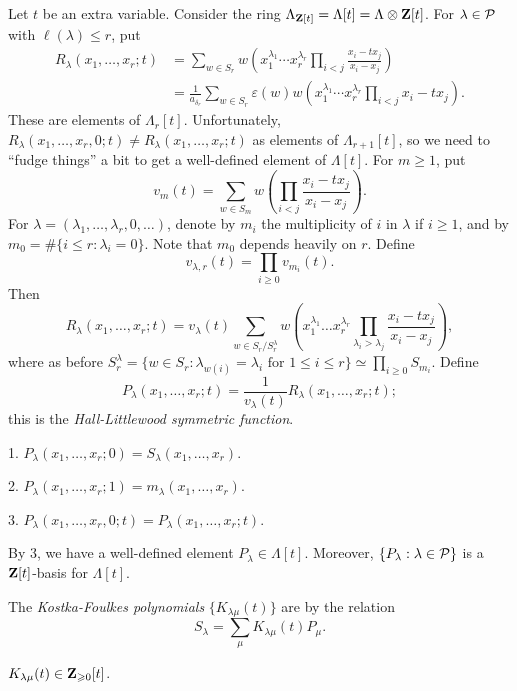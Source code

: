 Let $t$ be an extra variable. Consider the ring 
$\Lambda_{\mathbf{Z}[t]} = \Lambda[t] = \Lambda\otimes \mathbf{Z}[t]$. For $\lambda\in \mathcal{P}$ 
with $\ell(\lambda)\leqslant r$, put 
\begin{align*}
  R_\lambda(x_1,\dots,x_r;t) 
    &= \sum_{w\in S_r} w\left(x_1^{\lambda_1} \dotsm x_r^{\lambda_r} \prod_{i<j} \frac{x_i - t x_j}{x_i - x_j}\right) \\
    &= \frac{1}{a_{\delta_r}} \sum_{w\in S_r} \varepsilon(w) w\left(x_1^{\lambda_1} \dotsm x_r^{\lambda_r} \prod_{i<j} x_i - t x_j\right) .
\end{align*}
These are elements of $\Lambda_r[t]$. Unfortunately, 
$R_\lambda(x_1,\dots,x_r,0;t)\ne R_\lambda(x_1,\dots,x_r;t)$ as elements of 
$\Lambda_{r+1}[t]$, so we need to ``fudge things'' a bit to get a well-defined 
element of $\Lambda[t]$. For $m\geqslant 1$, put 
\[
  v_m(t) = \sum_{w\in S_m} w\left(\prod_{i<j} \frac{x_i-t x_j}{x_i - x_j}\right) .
\]
For $\lambda=(\lambda_1,\dots,\lambda_r,0,\dots)$, denote by $m_i$ the multiplicity 
of $i$ in $\lambda$ if $i\geqslant 1$, and by 
$m_0 = \#\{i\leqslant r:\lambda_i = 0\}$. Note that $m_0$ depends heavily on $r$. 
Define 
\[
  v_{\lambda,r}(t) = \prod_{i\geqslant 0} v_{m_i}(t) .
\]
Then 
\[
  R_\lambda(x_1,\dots,x_r;t) = v_\lambda(t) \sum_{w\in S_r/S_r^\lambda} w\left(x_1^{\lambda_1} \dots x_r^{\lambda_r} \prod_{\lambda_i>\lambda_j} \frac{x_i-t x_j}{x_i-x_j}\right) ,
\]
where as before 
$S_r^\lambda = \{w\in S_r:\lambda_{w(i)} = \lambda_i\text{ for }1\leqslant i\leqslant r\} \simeq \prod_{i\geqslant 0} S_{m_i}$. Define 
\[
  P_\lambda(x_1,\dots,x_r;t) = \frac{1}{v_\lambda(t)} R_\lambda(x_1,\dots,x_r;t) ; 
\]
this is the \emph{Hall-Littlewood symmetric function}. 

\begin{prop}
1. $P_\lambda(x_1,\dots,x_r;0) = S_\lambda(x_1,\dots,x_r)$. 

2. $P_\lambda(x_1,\dots,x_r;1) = m_\lambda(x_1,\dots,x_r)$. 

3. $P_\lambda(x_1,\dots,x_r,0;t) = P_\lambda(x_1,\dots,x_r;t)$. 
\end{prop}

By 3, we have a well-defined element $P_\lambda\in \Lambda[t]$. Moreover, 
$\{P_\lambda:\lambda\in \mathcal{P}\}$ is a $\mathbf{Z}[t]$-basis for $\Lambda[t]$. 

The \emph{Kostka-Foulkes polynomials} $\{K_{\lambda\mu}(t)\}$ are by 
the relation 
\[
  S_\lambda = \sum_\mu K_{\lambda\mu}(t) P_\mu .
\]

\begin{theo}
$K_{\lambda\mu}(t)\in \mathbf{Z}_{\geqslant 0}[t]$. 
\end{theo}





